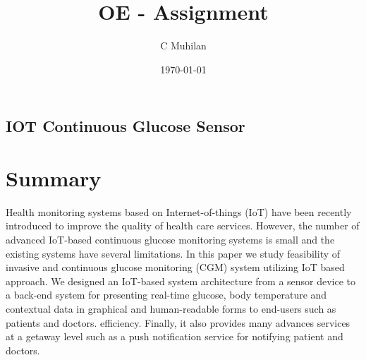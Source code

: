 \documentclass{report}
\title{OE - Assignment}
\author{C Muhilan}
\date{\today}
\begin{document}
    
    
    \begin{center}
        \section*{IOT Continuous Glucose Sensor}
    \end{center}
\setlength{\columnsep}{1.0cm}
    \large
    \section*{Summary}
   Health monitoring systems based on Internet-of-things (IoT) have been recently introduced to improve the quality of health care services. However, the number of advanced IoT-based continuous glucose monitoring systems is small and the existing systems have several limitations. In this paper we study feasibility of invasive and continuous glucose monitoring (CGM) system utilizing IoT based approach. We designed an IoT-based system architecture from a sensor device to a back-end system for presenting real-time glucose, body temperature and contextual data  in graphical and human-readable forms to end-users such as patients and doctors. efficiency. Finally, it also provides many advances services at a getaway level such as   a push notification service for notifying patient and doctors.
\end{document}
